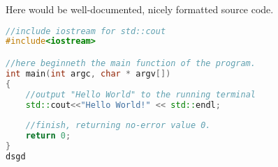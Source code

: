 
Here would be well-documented, nicely formatted source code.


\begin{lstlisting}[language={C++}, label={Hello World.}, frame = single ]
//include iostream for std::cout
#include<iostream>

//here beginneth the main function of the program.
int main(int argc, char * argv[])
{
	//output "Hello World" to the running terminal
	std::cout<<"Hello World!" << std::endl;
	
	//finish, returning no-error value 0.
	return 0;
}
dsgd
\end{lstlisting}